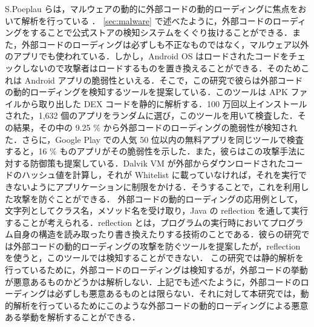 S.Poeplau らは，マルウェアの動的に外部コードの動的ローディングに焦点をおいて解析を行っている \cite{dynamicloading} ． \ref{sec:malware} で述べたように，外部コードのローディングをすることで公式ストアの検知システムをくぐり抜けることができる．また，外部コードのローディングは必ずしも不正なものではなく，マルウェア以外のアプリでも使われている．しかし，Android OS はロードされたコードをチェックしないので攻撃者はロードするものを置き換えることができる．そのためこれは Android アプリの脆弱性といえる．そこで，この研究で彼らは外部コードの動的ローディングを検知するツールを提案している．このツールは APK ファイルから取り出した DEX コードを静的に解析する．100 万回以上インストールされた，1,632 個のアプリをランダムに選び，このツールを用いて検査した．その結果，その中の 9.25 \% から外部コードのローディングの脆弱性が検知された．さらに，Google Play  での人気 50 位以内の無料アプリを同じツールで検査すると，16 \% ものアプリがその脆弱性を示した．また，彼らはこの攻撃手法に対する防御策も提案している．Dalvik VM が外部からダウンロードされたコードのハッシュ値を計算し，それが Whitelist に載っていなければ，それを実行できないようにアプリケーションに制限をかける．そうすることで，これを利用した攻撃を防ぐことができる．
外部コードの動的ローディングの応用例として，文字列としてクラス名，メソッド名を受け取り，Java の reflection を通して実行することが考えられる．reflection  とは，プログラムの実行時においてプログラム自身の構造を読み取ったり書き換えたりする技術のことである．彼らの研究では外部コードの動的ローディングの攻撃を防ぐツールを提案したが，reflection を使うと，このツールでは検知することができない．
この研究では静的解析を行っているために，外部コードのローディングは検知するが，外部コードの挙動が悪意あるものかどうかは解析しない．上記でも述べたように，外部コードのローディングは必ずしも悪意あるものとは限らない．それに対して本研究では，動的解析を行っているためにこのような外部コードの動的ローディングによる悪意ある挙動を解析することができる．


